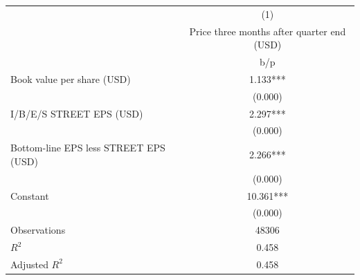 {
\def\sym#1{\ifmmode^{#1}\else\(^{#1}\)\fi}
\begin{tabular}{l*{1}{c}}
\hline\hline
                    &\multicolumn{1}{c}{(1)}\\
                    &\multicolumn{1}{c}{Price three months after quarter end (USD)}\\
                    &         b/p   \\
\hline
Book value per share (USD)&       1.133***\\
                    &     (0.000)   \\
I/B/E/S STREET EPS (USD)&       2.297***\\
                    &     (0.000)   \\
Bottom-line EPS less STREET EPS (USD)&       2.266***\\
                    &     (0.000)   \\
Constant            &      10.361***\\
                    &     (0.000)   \\
\hline
Observations        &       48306   \\
\(R^{2}\)           &       0.458   \\
Adjusted \(R^{2}\)  &       0.458   \\
\hline\hline
\end{tabular}
}
